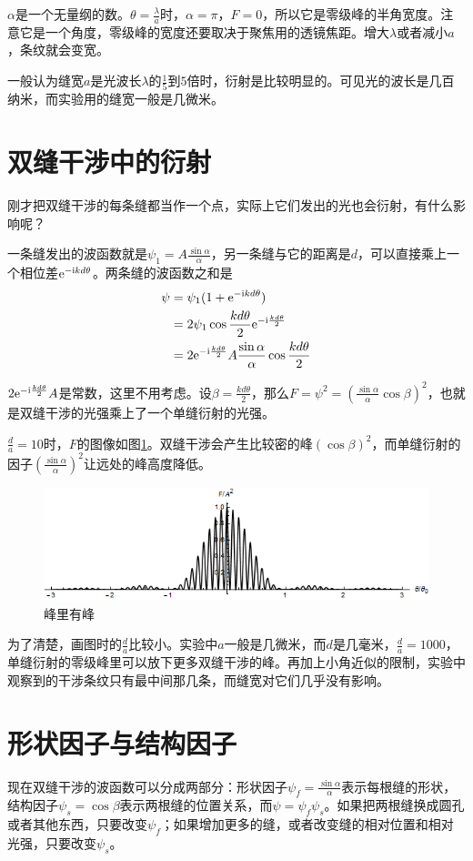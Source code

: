 $\alpha$是一个无量纲的数。$\theta=\frac{\lambda}{a}$时，$\alpha=\pi$，$F=0$，所以它是零级峰的半角宽度。注意它是一个角度，零级峰的宽度还要取决于聚焦用的透镜焦距。增大$\lambda$或者减小$a$，条纹就会变宽。

一般认为缝宽$a$是光波长$\lambda$的$\frac{1}{5}$到$5$倍时，衍射是比较明显的。可见光的波长是几百纳米，而实验用的缝宽一般是几微米。
\section{双缝干涉中的衍射}
刚才把双缝干涉的每条缝都当作一个点，实际上它们发出的光也会衍射，有什么影响呢？

一条缝发出的波函数就是$\psi_1=A \frac{\sin \alpha}{\alpha}$，另一条缝与它的距离是$d$，可以直接乘上一个相位差$\mathrm{e}^{-\mathrm{i} k d \theta}$。两条缝的波函数之和是
\begin{align*}
\psi&=\psi_1 (1+\mathrm{e}^{-\mathrm{i} k d \theta}) \\
&=2 \psi_1 \cos \frac{k d \theta}{2} \mathrm{e}^{-\mathrm{i} \frac{k d \theta}{2}} \\
&=2 \mathrm{e}^{-\mathrm{i} \frac{k d \theta}{2}} A \frac{\sin \alpha}{\alpha} \cos \frac{k d \theta}{2}
\end{align*}

$2 \mathrm{e}^{-\mathrm{i} \frac{k d \theta}{2}} A$是常数，这里不用考虑。设$\beta=\frac{k d \theta}{2}$，那么$F=\psi^2=(\frac{\sin \alpha}{\alpha} \cos  \beta)^2$，也就是双缝干涉的光强乘上了一个单缝衍射的光强。

$\frac{d}{a}=10$时，$F$的图像如图\ref{fig-silt-diff-plot-2}。双缝干涉会产生比较密的峰$(\cos \beta)^2$，而单缝衍射的因子$(\frac{\sin \alpha}{\alpha})^2$让远处的峰高度降低。
\begin{figure}[htb]
\centering
\includegraphics[width=0.33\linewidth]{fig/silt-diff-plot-2.png}
\caption{峰里有峰}
\label{fig-silt-diff-plot-2}
\end{figure}

为了清楚，画图时的$\frac{d}{a}$比较小。实验中$a$一般是几微米，而$d$是几毫米，$\frac{d}{a}=1000$，单缝衍射的零级峰里可以放下更多双缝干涉的峰。再加上小角近似的限制，实验中观察到的干涉条纹只有最中间那几条，而缝宽对它们几乎没有影响。
\section{形状因子与结构因子}
现在双缝干涉的波函数可以分成两部分：形状因子$\psi_f=\frac{\sin \alpha}{\alpha}$表示每根缝的形状，结构因子$\psi_s=\cos \beta$表示两根缝的位置关系，而$\psi=\psi_f \psi_s$。如果把两根缝换成圆孔或者其他东西，只要改变$\psi_f$；如果增加更多的缝，或者改变缝的相对位置和相对光强，只要改变$\psi_s$。


